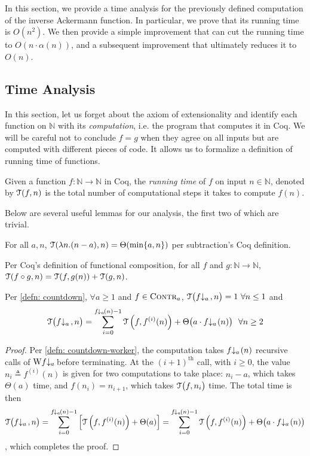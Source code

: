 In this section, we provide a time analysis for the previously defined computation of the inverse Ackermann function. In particular, we prove that its running time is $O(n^2)$. We then provide a simple improvement that can cut the running time to $O(n\cdot\alpha(n))$, and a subsequent improvement that ultimately reduces it to $O(n)$.
\subsection{Time Analysis}
In this section, let us forget about the axiom of extensionality and identify each function on $\mathbb{N}$ with its \emph{computation}, i.e. the program that computes it in Coq. We will be careful not to conclude $f = g$ when they agree on all inputs but are computed with different pieces of code. It allows us to formalize a definition of running time of functions.
\begin{defn}
	Given a function $f:\mathbb{N}\to\mathbb{N}$ in Coq, the \emph{running time} of $f$ on input $n\in \mathbb{N}$, denoted by $\mathcal{T}(f, n)$ is the total number of computational steps it takes to compute $f(n)$.
\end{defn}
Below are several useful lemmas for our analysis, the first two of which are trivial.
\begin{lem} \label{lem: sub-runtime}
	For all $a, n$, $\mathcal{T}(\lambda n.(n - a), n) = \Theta(\min\{a, n\})$ per subtraction's Coq definition.
\end{lem}
\begin{lem} \label{lem: compose-runtime}
	Per Coq's definition of functional composition, for all $f$ and $g: \mathbb{N}\to \mathbb{N}$, $\mathcal{T}(f\circ g, n) = \mathcal{T}(f, g(n)) + \mathcal{T}(g, n)$.
\end{lem}
\begin{lem} \label{lem: cdt-runtime}
	Per \cref{defn: countdown}, $\forall a\ge 1$ and $f\in \text{\scshape{Contr}}_{a}$, $\runtime\big(\cdt{f}{a}\ , n\big) = 1 \ \forall n\le 1$ and
	\begin{equation*}
	\runtime\big(\cdt{f}{a}\ , n\big) = \sum_{i=0}^{\cdt{f}{a}(n) - 1} \runtime\left(f, f^{(i)}(n)\right) + \Theta\big(a\cdot \cdt{f}{a}(n)\big) \ \ \forall n\ge 2
	\end{equation*}
\end{lem}
\begin{proof}
	Per \cref{defn: countdown-worker}, the computation takes $\cdt{f}{a}(n)$ recursive calls of $\W\cdt{f}{a}$ before terminating. At the $(i+1)^{\text{th}}$ call, with $i\ge 0$, the value $n_i \triangleq f^{(i)}(n)$ is given for two computations to take place: $n_i - a$, which takes $\Theta(a)$ time, and $f(n_i) = n_{i+1}$, which takes $\mathcal{T}\big(f, n_i\big)$ time. The total time is then
	\begin{equation*}
	\runtime\big(\cdt{f}{a}\ , n\big)
	= \sum_{i=0}^{\cdt{f}{a}(n) - 1} \left[\runtime\left(f, f^{(i)}(n)\right) + \Theta(a)\right]
	= \sum_{i=0}^{\cdt{f}{a}(n) - 1} \runtime\left(f, f^{(i)}(n)\right) + \Theta\big(a\cdot \cdt{f}{a}(n)\big)
	\end{equation*}
	, which completes the proof.
\end{proof}

